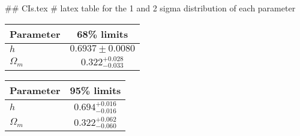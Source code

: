 ## CIs.tex
# latex table for the 1 and 2 sigma distribution of each parameter

\begin{tabular} { l  c}
 Parameter &  68\% limits\\
\hline
{\boldmath$h              $} & $0.6937\pm 0.0080          $\\
{\boldmath$\Omega_m       $} & $0.322^{+0.028}_{-0.033}   $\\
\hline
\end{tabular}

\begin{tabular} { l  c}
 Parameter &  95\% limits\\
\hline
{\boldmath$h              $} & $0.694^{+0.016}_{-0.016}   $\\
{\boldmath$\Omega_m       $} & $0.322^{+0.062}_{-0.060}   $\\
\hline
\end{tabular}
